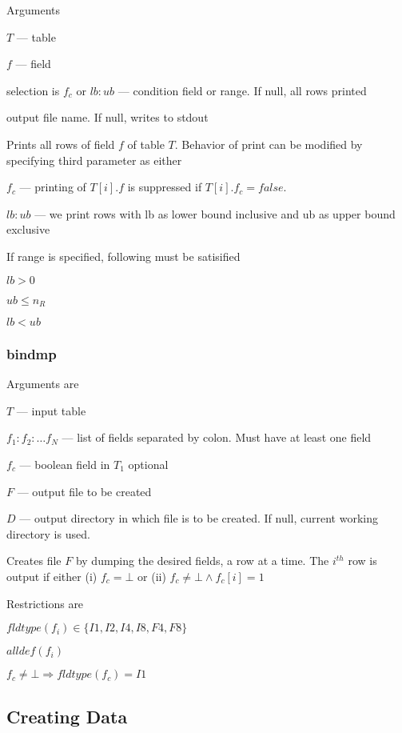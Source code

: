 \label{pr_fld}
Arguments 
\be
\item \(T\) --- table
\item \(f\) --- field
\item selection is \(f_c\) or \(lb:ub\) --- condition field or range. 
If null, all rows printed
\item output file name. If null, writes to stdout
\ee

Prints all rows of field \(f\) of table \(T\). Behavior of print can be
modified by specifying third parameter as either
\be
\item \(f_c\) --- printing of \(T[i].f\) is suppressed if \(T[i].f_c = false\).
\item \(lb:ub\) --- we print rows with lb as lower bound inclusive and
ub as upper bound exclusive
\ee

If range is specified, following must be satisified
\be
\item \(lb > 0 \)
\item \(ub \leq n_R\)
\item \(lb < ub\)
\ee

\subsubsection{bindmp}
\label{bindmp}
Arguments are
\be
\item \(T\) --- input table
\item \(f_1:f_2:\ldots f_N\) --- list of fields separated by colon. Must
have at least one field
\item \(f_c\) --- boolean field in \(T_1\) optional
\item \(F\) --- output file to be created
\item \(D\) --- output directory in which file is to be created. If
null, current working directory is used. 
\ee

Creates file \(F\) by dumping the desired fields, a row at a time. The
\(i^{th}\) row is output if either (i) \(f_c = \bot\) or (ii) 
  \(f_c \neq \bot \wedge f_c[i] = 1\) 

Restrictions are
\be
\item \(fldtype(f_i) \in \{ I1, I2, I4, I8, F4, F8\}\)
\item \(alldef(f_i)\)
\item \(f_c \neq \bot \Rightarrow fldtype(f_c) = I1\)
\ee

\subsection{Creating Data}

